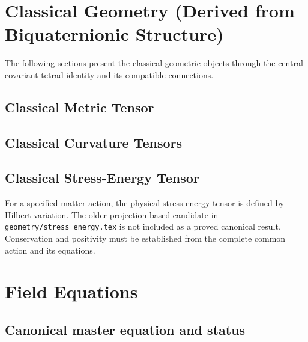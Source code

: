 \documentclass[12pt,a4paper]{article}
\begin{document}

\section{Classical Geometry (Derived from Biquaternionic Structure)}
\label{sec:classical_geometry}

The following sections present the classical geometric objects through the central covariant-tetrad identity and its compatible connections.

\subsection{Classical Metric Tensor}



\subsection{Classical Curvature Tensors}



\subsection{Classical Stress-Energy Tensor}

For a specified matter action, the physical stress-energy tensor is defined by
Hilbert variation.  The older projection-based candidate in
\texttt{geometry/stress\_energy.tex} is not included as a proved canonical
result.  Conservation and positivity must be established from the complete
common action and its equations.


\section{Field Equations}
\label{sec:field_equations}

\subsection{Canonical master equation and status}
\end{document}
